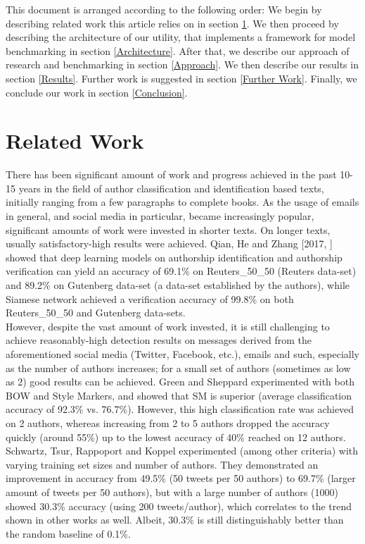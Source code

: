 \documentclass[a4paper]{article}
\begin{document}
This document is arranged according to the following order:
We begin by describing related work this article relies on in section \ref{Related Work}.
We then proceed by describing the architecture of our utility, that implements a framework for model benchmarking in section \ref{Architecture}.
After that, we describe our approach of research and benchmarking in section \ref{Approach}.
We then describe our results in section \ref{Results}.
Further work is suggested in section \ref{Further Work}.
Finally, we conclude our work in section \ref{Conclusion}.
\section{Related Work}
\label{Related Work}

There has been significant amount of work and progress achieved in the past 10-15 years in the field of author classification and identification based texts, initially ranging from a few paragraphs to complete books. As the usage of emails in general, and social media in particular, became increasingly popular, significant amounts of work were invested in shorter texts.
On longer texts, usually satisfactory-high results were achieved. Qian, He and Zhang [2017, \cite{qian}] showed that deep learning models on authorship identification and authorship verification can yield an accuracy of 69.1\% on Reuters\_50\_50 (Reuters data-set) and 89.2\% on Gutenberg data-set (a data-set established by the authors), while Siamese network achieved a verification accuracy of 99.8\% on both Reuters\_50\_50 and Gutenberg data-sets.\\
However, despite the vast amount of work invested, it is still challenging to achieve reasonably-high detection results on messages derived from the aforementioned social media (Twitter, Facebook, etc.), emails and such, especially as the number of authors increases; for a small set of authors (sometimes as low as 2) good results can be achieved. Green and Sheppard \cite{rachel} experimented with both BOW and Style Markers, and showed that SM is superior (average classification accuracy of 92.3\% vs. 76.7\%). However, this high classification rate was achieved on 2 authors, whereas increasing from 2 to 5 authors dropped the accuracy quickly (around 55\%) up to the lowest accuracy of 40\% reached on 12 authors.
Schwartz, Tsur, Rappoport and Koppel \cite{schwartz} experimented (among other criteria) with varying training set sizes and number of authors. They demonstrated an improvement in accuracy from 49.5\% (50 tweets per 50 authors) to 69.7\% (larger amount of tweets per 50 authors), but with a large number of authors (1000) showed 30.3\% accuracy (using 200 tweets/author), which correlates to the trend shown in other works as well. Albeit, 30.3\% is still  distinguishably better than the random baseline of 0.1\%.
\end{document}
